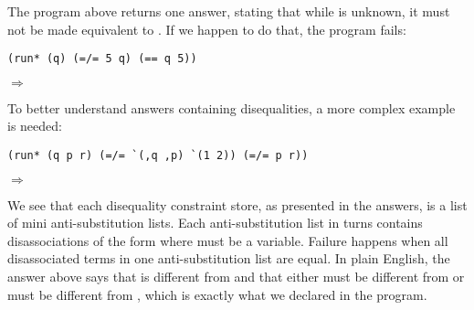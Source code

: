 The program above returns one answer, stating that while  is unknown, it must not be made equivalent to . If we happen to do that, the program fails:
\begin{lstlisting}
(run* (q) (=/= 5 q) (== q 5))
\end{lstlisting}
$\Rightarrow$ \code{()}

To better understand answers containing disequalities, a more complex example is needed:
\begin{lstlisting}
(run* (q p r) (=/= `(,q ,p) `(1 2)) (=/= p r))
\end{lstlisting}
$\Rightarrow$

We see that each disequality constraint store, as presented in the answers, is a list of mini anti-substitution lists. Each anti-substitution list in turns contains disassociations of the form  where  must be a variable. Failure happens when all disassociated terms in one anti-substitution list are equal. In plain English, the answer above says that  is different from  and that either  must be different from  or  must be different from , which is exactly what we declared in the program.